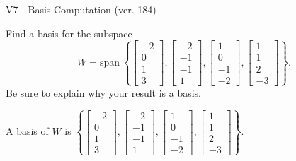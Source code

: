 \begin{exercise}
  \begin{exerciseTitle}V7 - Basis Computation (ver. 184)\end{exerciseTitle}
  \begin{exerciseStatement}
    Find a basis for the subspace 
\[W=\mathrm{span}\ \left\{\left[\begin{array}{r}
-2 \\
0 \\
1 \\
3
\end{array}\right] , \left[\begin{array}{r}
-2 \\
-1 \\
-1 \\
1
\end{array}\right] , \left[\begin{array}{r}
1 \\
0 \\
-1 \\
-2
\end{array}\right] , \left[\begin{array}{r}
1 \\
1 \\
2 \\
-3
\end{array}\right]\right\}.\]
 Be sure to explain why your result is a basis.


  \end{exerciseStatement}
  \begin{exerciseAnswer}
   A basis of \(W\) is  \(\left\{\left[\begin{array}{r}
-2 \\
0 \\
1 \\
3
\end{array}\right] , \left[\begin{array}{r}
-2 \\
-1 \\
-1 \\
1
\end{array}\right] , \left[\begin{array}{r}
1 \\
0 \\
-1 \\
-2
\end{array}\right] , \left[\begin{array}{r}
1 \\
1 \\
2 \\
-3
\end{array}\right]\right\}\).
  


  \end{exerciseAnswer}
\end{exercise}